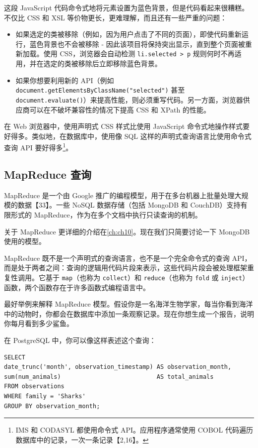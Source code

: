 这段 JavaScript 代码命令式地将元素设置为蓝色背景，但是代码看起来很糟糕。不仅比 CSS 和 XSL 等价物更长，更难理解，而且还有一些严重的问题：

\begin{itemize}
    \item 如果选定的类被移除（例如，因为用户点击了不同的页面），即使代码重新运行，蓝色背景也不会被移除 - 因此该项目将保持突出显示，直到整个页面被重新加载。使用 CSS，浏览器会自动检测 \texttt{li.selected > p} 规则何时不再适用，并在选定的类被移除后立即移除蓝色背景。
    \item 如果你想要利用新的 API（例如 \texttt{document.getElementsByClassName("selected")} 甚至 \texttt{document.evaluate()}）来提高性能，则必须重写代码。另一方面，浏览器供应商可以在不破坏兼容性的情况下提高 CSS 和 XPath 的性能。
\end{itemize}

在 Web 浏览器中，使用声明式 CSS 样式比使用 JavaScript 命令式地操作样式要好得多。类似地，在数据库中，使用像 SQL 这样的声明式查询语言比使用命令式查询 API 要好得多\footnote{IMS 和 CODASYL 都使用命令式 API。应用程序通常使用 COBOL 代码遍历数据库中的记录，一次一条记录【2,16】。}。

\subsection{MapReduce 查询}

MapReduce 是一个由 Google 推广的编程模型，用于在多台机器上批量处理大规模的数据【33】。一些 NoSQL 数据存储（包括 MongoDB 和 CouchDB）支持有限形式的 MapReduce，作为在多个文档中执行只读查询的机制。

关于 MapReduce 更详细的介绍在\autoref{ch:ch10}。现在我们只简要讨论一下 MongoDB 使用的模型。

MapReduce 既不是一个声明式的查询语言，也不是一个完全命令式的查询 API，而是处于两者之间：查询的逻辑用代码片段来表示，这些代码片段会被处理框架重复性调用。它基于 \texttt{map}（也称为 \texttt{collect}）和 \texttt{reduce}（也称为 \texttt{fold} 或 \texttt{inject}）函数，两个函数存在于许多函数式编程语言中。

最好举例来解释 MapReduce 模型。假设你是一名海洋生物学家，每当你看到海洋中的动物时，你都会在数据库中添加一条观察记录。现在你想生成一个报告，说明你每月看到多少鲨鱼。

在 PostgreSQL 中，你可以像这样表述这个查询：

\begin{lstlisting}
SELECT
date_trunc('month', observation_timestamp) AS observation_month,
sum(num_animals)                           AS total_animals
FROM observations
WHERE family = 'Sharks'
GROUP BY observation_month;
\end{lstlisting}

